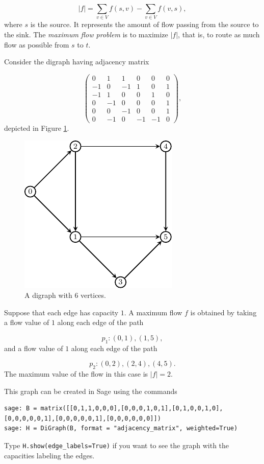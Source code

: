 \[
| f | = \sum_{v\in V}f(s,v)-\sum_{v\in V}f(v,s),
\]
where $s$ is the source.
It represents the amount of flow passing from the source to the sink.
The {\it maximum flow problem} is to maximize $| f |$, that is, to route as
much flow as possible from $s$ to $t$.

\begin{example}
{\rm
Consider the digraph having adjacency matrix

\[
\left(\begin{array}{cccccc}
0 & 1 & 1 & 0 & 0 & 0 \\
-1 & 0 & -1 & 1 & 0 & 1 \\
-1 & 1 & 0 & 0 & 1 & 0 \\
0 & -1 & 0 & 0 & 0 & 1 \\
0 & 0 & -1 & 0 & 0 & 1 \\
0 & -1 & 0 & -1 & -1 & 0
\end{array}\right),
\]
depicted in Figure \ref{fig:network_flows:digraph_flow}.

\begin{figure}[!htbp]
\centering
\includegraphics{image/network-flows/digraph-flow}
\caption{A digraph with $6$ vertices.}
\label{fig:network_flows:digraph_flow}
\end{figure}
Suppose that each edge has capacity $1$.
A maximum flow $f$ is obtained by taking a flow value
of $1$ along each edge of the path

\[
p_1:(0,1),(1,5),
\]
and a flow value
of $1$ along each edge of the path

\[
p_2:(0,2),(2,4),(4,5).
\]
The maximum value of the flow in this case is $|f|=2$.

This graph can be created in Sage using the commands

\begin{lstlisting}
sage: B = matrix([[0,1,1,0,0,0],[0,0,0,1,0,1],[0,1,0,0,1,0],[0,0,0,0,0,1],[0,0,0,0,0,1],[0,0,0,0,0,0]])
sage: H = DiGraph(B, format = "adjacency_matrix", weighted=True)
\end{lstlisting}

\noindent
Type {\tt H.show(edge\_labels=True)} if you want to see the graph with
the capacities labeling the edges.


}
\end{example}


